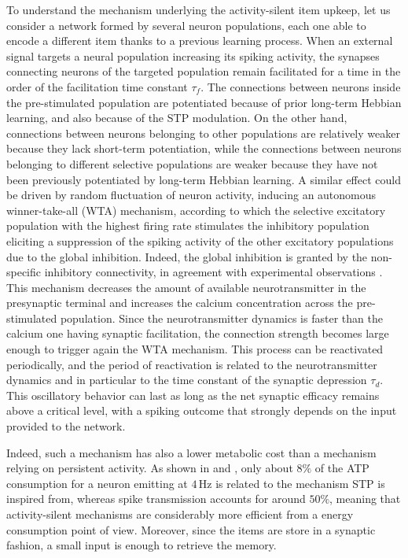 \documentclass[a4paper, 12pt, twoside, openright]{book}
\begin{document}
To understand the mechanism underlying the activity-silent item upkeep, let us consider a network formed by several neuron populations, each one able to encode a different item thanks to a previous learning process. When an external signal targets a neural population increasing its spiking activity, the synapses connecting neurons of the targeted population remain facilitated for a time in the order of the facilitation time constant $\tau_f$.
The connections between neurons inside the pre-stimulated population are potentiated because of prior long-term Hebbian learning, and also because of the STP modulation.
On the other hand, connections between neurons belonging to other populations are relatively weaker because they lack short-term potentiation, while the connections between neurons belonging to different selective populations are weaker because they have not been previously potentiated by long-term Hebbian learning. A similar effect could be driven by random fluctuation of neuron activity, inducing an autonomous winner-take-all (WTA) mechanism, according to which the selective excitatory population with the highest firing rate stimulates the inhibitory population eliciting a suppression of the spiking activity of the other excitatory populations \cite{Coultrip1992} due to the global inhibition. Indeed, the global inhibition is granted by the non-specific inhibitory connectivity, in agreement with experimental observations \cite{Fino2011}.
This mechanism decreases the amount of available neurotransmitter in the presynaptic terminal and increases the calcium concentration across the pre-stimulated population. Since the neurotransmitter dynamics is faster than the calcium one having synaptic facilitation, the connection strength becomes large enough to trigger again the WTA mechanism. This process can be reactivated periodically, and the period of reactivation is related to the neurotransmitter dynamics and in particular to the time constant of the synaptic depression $\tau_d$.
This oscillatory behavior can last as long as the net synaptic efficacy remains above a critical level, with a spiking outcome that strongly depends on the input provided to the network.


Indeed, such a mechanism has also a lower metabolic cost than a mechanism relying on persistent activity. As shown in \cite{Attwell2001} and \cite{Lennie2003}, only about $8\%$ of the ATP consumption for a neuron emitting at $4$\,Hz is related to the mechanism STP is inspired from, whereas spike transmission accounts for around $50\%$, meaning that activity-silent mechanisms are considerably more efficient from a energy consumption point of view. Moreover, since the items are store in a synaptic fashion, a small input is enough to retrieve the memory.
\end{document}

